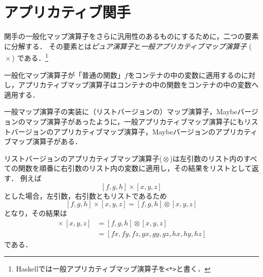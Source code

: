 \documentclass[twocolumn]{jsbook}
\newcommand{\keyword}[1]{{\emph{#1}}}
\newcommand{\code}[1]{\texttt{#1}}
\DeclareMathOperator{\hsklApplicativeMap}{\times}
\DeclareMathOperator{\hsklApplicativeListMap}{\otimes}
\DeclareMathOperator{\hsklFmap}{\cdot}
\DeclareMathOperator{\hsklMap}{\odot}
\DeclareMathOperator{\mathCompose}{\bullet}
\newcommand{\mathLambdaAnonymousParameter}{\lozenge}
\newcommand{\mathFunctor}[1]{\mathrm{#1}}
\begin{document}




\section{アプリカティブ関手}

関手の一般化マップ演算子をさらに汎用性のあるものにするために，二つの要素に分解する．
その要素とは\keyword{ピュア演算子}と\keyword{一般アプリカティブマップ演算子} ($\hsklApplicativeMap$) である．\footnote{Haskellでは一般アプリカティブマップ演算子を\code{<*>}と書く．}

一般化マップ演算子が「普通の関数」$f$をコンテナの中の変数に適用するのに対し，アプリカティブマップ演算子はコンテナの中の関数をコンテナの中の変数へ適用する．

一般マップ演算子の実装に（リストバージョンの）マップ演算子，Maybeバージョンのマップ演算子があったように，一般アプリカティブマップ演算子にもリストバージョンのアプリカティブマップ演算子，Maybeバージョンのアプリカティブマップ演算子がある．

リストバージョンのアプリカティブマップ演算子($\hsklApplicativeListMap$)は左引数のリスト内のすべての関数を順番に右引数のリスト内の変数に適用し，その結果をリストとして返す．
例えば$$[f,g,h]\hsklApplicativeMap[x,y,z]$$とした場合，左引数，右引数ともリストであるため$$[f,g,h]\hsklApplicativeMap[x,y,z]=[f,g,h]\hsklApplicativeListMap[x,y,z]$$となり，その結果は
\begin{align*}
[f,g,h]\hsklApplicativeMap[x,y,z]&=[f,g,h]\hsklApplicativeListMap[x,y,z]\\
&=[fx,fy,fz,gx,gy,gz,hx,hy,hz]
\end{align*}
である．
\end{document}
